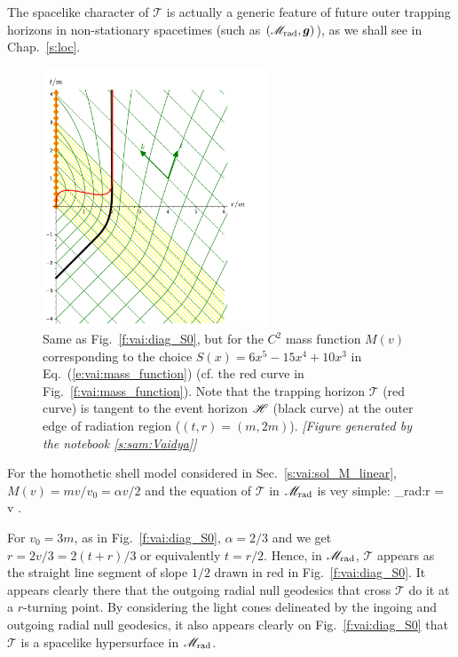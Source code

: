 \begin{remark}
The spacelike character of $\mathscr{T}$ is actually a generic feature of future outer trapping horizons in non-stationary spacetimes (such as $(\mathscr{M}_{\rm rad},\bm{g})$),
as we shall see in Chap.~\ref{s:loc}.
\end{remark}

\begin{figure}
\centerline{\includegraphics[width=0.6\textwidth]{vai_diag_S2.pdf}}
\caption[]{\label{f:vai:diag_S2} \footnotesize
Same as Fig.~\ref{f:vai:diag_S0}, but for the $C^2$ mass function $M(v)$
corresponding to the choice $S(x) = 6 x^5 - 15 x^4 + 10 x^3$
in Eq.~(\ref{e:vai:mass_function}) (cf. the red curve in Fig.~\ref{f:vai:mass_function}).
Note that the trapping horizon $\mathscr{T}$
(red curve) is tangent to the event horizon $\mathscr{H}$ (black curve) at the
outer edge of radiation region ($(t, r) = (m, 2m)$).
\textsl{[Figure generated by the notebook \ref{s:sam:Vaidya}]}
}
\end{figure}

For the homothetic shell model considered in Sec.~\ref{s:vai:sol_M_linear},
$M(v) = m v / v_0 = \alpha v / 2$ and the equation of
$\mathscr{T}$ in $\mathscr{M}_{\rm rad}$ is vey simple:
\be \label{e:vai:def_T_hom}
     \cap \M_{\rm rad}:\qquad r = \alpha v .
\ee

\begin{example}
For $v_0 = 3m$, as in Fig.~\ref{f:vai:diag_S0},
$\alpha = 2/3$ and we get $r = 2v/3 = 2(t+r)/3$ or equivalently $t = r / 2$. Hence, in $\mathscr{M}_{\rm rad}$,
$\mathscr{T}$ appears as the straight line segment of slope $1/2$
drawn in red in Fig.~\ref{f:vai:diag_S0}.
It appears clearly there that the outgoing radial null geodesics
that cross $\mathscr{T}$ do it at a $r$-turning point.
By considering the light cones delineated by the ingoing and outgoing radial null geodesics, it
also appears
clearly on Fig.~\ref{f:vai:diag_S0} that $\mathscr{T}$ is a spacelike hypersurface in $\mathscr{M}_{\rm rad}$.
\end{example}

